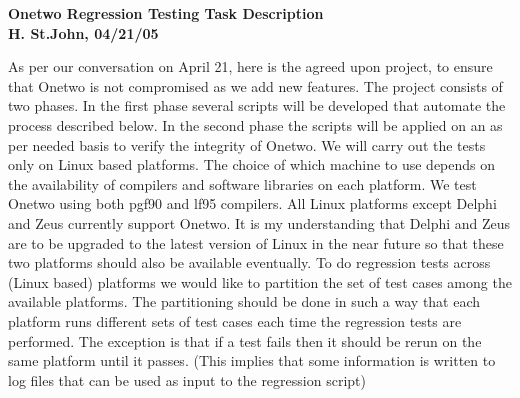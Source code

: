 \documentclass[12pt]{article}
\begin{document}
 
\begin{center} \bfseries
  Onetwo  Regression Testing Task Description \\
  H. St.John, 04/21/05 \\
\end{center}
        
\normalsize \mdseries

 
As per our conversation on April 21, here is the agreed upon project,
to ensure that Onetwo is not compromised as we add new features.
The project consists of two phases. In the  first phase several
scripts will be developed that automate the process described below.
In the second phase the scripts will be applied on an as per needed 
basis to verify the integrity of Onetwo. We will carry out the 
tests only on Linux based platforms. The choice of which machine to
use depends on the availability of compilers and software libraries
on each platform. We test Onetwo using both pgf90 and lf95
compilers. All Linux platforms except Delphi and Zeus currently
support Onetwo. It is my understanding that Delphi and Zeus are to be 
upgraded to the latest version of Linux in the near future so that
these two platforms should also be available eventually. To do
regression tests across (Linux based) platforms we would like to
partition the set of test cases among the available platforms.
The partitioning should be done in such a way that each platform runs
different sets of test cases each time the regression tests are
performed. The exception is that if a test fails then it should be
rerun on the same platform until it passes. (This implies that some
information is written to log files that can be used as input
to the regression script)
\end{document}
